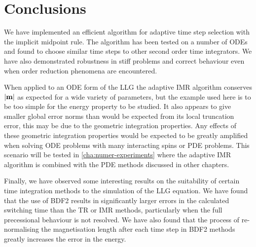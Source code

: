 \section{Conclusions}

We have implemented an efficient algorithm for adaptive time step selection with the implicit midpoint rule.
The algorithm has been tested on a number of ODEs and found to choose similar time steps to other second order time integrators.
We have also demonstrated robustness in stiff problems and correct behaviour even when order reduction phenomena are encountered.

When applied to an ODE form of the LLG the adaptive IMR algorithm conserves $\left|{\boldsymbol{\mathrm{m}}} \right|$ as expected for a wide variety of parameters, but the example used here is to be too simple for the energy property to be studied.
It also appears to give smaller global error norms than would be expected from its local truncation error, this may be due to the geometric integration properties.
Any effects of these geometric integration properties would be expected to be greatly amplified when solving ODE problems with many interacting spins or PDE problems.
This scenario will be tested in \cref{cha:numer-experiments} where the adaptive IMR algorithm is combined with the PDE methods discussed in other chapters.

Finally, we have observed some interesting results on the suitability of certain time integration methods to the simulation of the LLG equation.
We have found that the use of BDF2 results in significantly larger errors in the calculated switching time than the TR or IMR methods, particularly when the full precessional behaviour is not resolved.
We have also found that the process of re-normalising the magnetisation length after each time step in BDF2 methods greatly increases the error in the energy.


